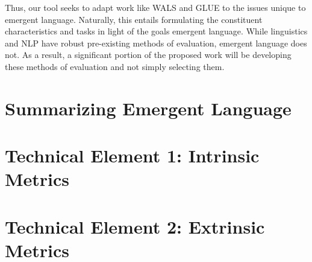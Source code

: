 \newpage

Thus, our tool seeks to adapt work like WALS and GLUE to the issues unique to emergent language.
Naturally, this entails formulating the constituent characteristics and tasks in light of the goals emergent language.
While linguistics and NLP have robust pre-existing methods of evaluation, emergent language does not.
As a result, a significant portion of the proposed work will be developing these methods of evaluation and not simply selecting them.





\section{Summarizing Emergent Language}

\section{Technical Element 1: Intrinsic Metrics}
\section{Technical Element 2: Extrinsic Metrics}
